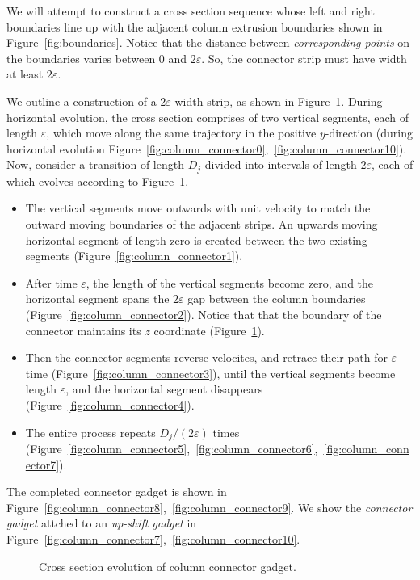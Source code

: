 We will attempt to construct a cross section sequence whose left and right boundaries
line up with the adjacent column extrusion boundaries shown in Figure~\ref{fig:boundaries}.
Notice that the distance between \emph{corresponding points} on the boundaries varies between $0$ and $2\varepsilon$.
So, the connector strip must have width at least $2\varepsilon$.

We outline a construction of a $2\varepsilon$ width strip, as shown in Figure~\ref{fig:connector_cross_section}.
During horizontal evolution, the cross section comprises of two vertical segments, each of length $\varepsilon$,
which move along the same trajectory in the positive $y$-direction
(during horizontal evolution Figure~\ref{fig:column_connector0},~\ref{fig:column_connector10}).
Now, consider a transition of length $D_j$ divided into intervals of length $2\varepsilon$,
each of which evolves according to Figure~\ref{fig:connector_cross_section}.
\begin{itemize}
    \item The vertical segments move outwards with unit velocity to match the outward moving boundaries of the adjacent strips.
          An upwards moving horizontal segment of length zero is created between the two existing segments (Figure~\ref{fig:column_connector1}).
\end{itemize}

\begin{itemize}[resume, before = \vspace*{-\dimexpr\topsep+\partopsep\relax}]
    \item After time $\varepsilon$, the length of the vertical segments become zero,
          and the horizontal segment spans the $2\varepsilon$ gap between the column boundaries (Figure~\ref{fig:column_connector2}).
          Notice that that the boundary of the connector maintains its $z$ coordinate (Figure~\ref{fig:connector_cross_section}).
    \item Then the connector segments reverse velocites, and retrace their path for $\varepsilon$ time (Figure~\ref{fig:column_connector3}),
          until the vertical segments become length $\varepsilon$, and the horizontal segment disappears (Figure~\ref{fig:column_connector4}).
    \item The entire process repeats $D_j/(2\varepsilon)$ times (Figure~\ref{fig:column_connector5},~\ref{fig:column_connector6},~\ref{fig:column_connector7}).
\end{itemize}

The completed connector gadget is shown in Figure~\ref{fig:column_connector8},~\ref{fig:column_connector9}.
We show the \emph{connector gadget} attched to an \emph{up-shift gadget} in Figure~\ref{fig:column_connector7},~\ref{fig:column_connector10}.
\graphicspath{{./figures/}}
\begin{figure}[!h]
    \def\svgwidth{1.0\textwidth}
    \caption{
    Cross section evolution of column connector gadget.
    }
    \vspace{-1.5em}
    \label{fig:connector_cross_section}
\end{figure}




